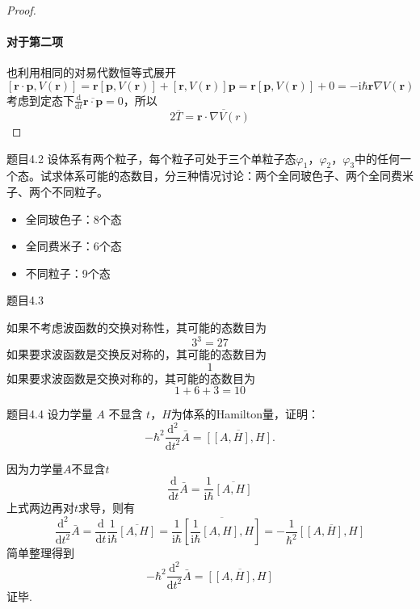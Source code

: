 \begin{proof}
    \paragraph{对于第二项} 也利用相同的对易代数恒等式展开
    $$
        \left[\boldsymbol{r}\cdot\boldsymbol{p}, V(\boldsymbol{r})\right]
        = \boldsymbol{r}\left[\boldsymbol{p}, V(\boldsymbol{r})\right] + \left[\boldsymbol{r}, V(\boldsymbol{r})\right]\boldsymbol{p}
        =\boldsymbol{r}[\boldsymbol{p}, V(\boldsymbol{r})]+0
        = -\mathrm{i}\hbar\boldsymbol{r}\nabla{V(\boldsymbol{r})}
    $$
    考虑到定态下$\frac{\mathrm{d}}{\mathrm{d}t}\overline{\boldsymbol{r}\cdot\boldsymbol{p}}=0$，所以
    $$
        2\overline{T} = \overline{\boldsymbol{r}\cdot\nabla{V(r)}}
    $$
\end{proof}


\begin{question}{题目4.2}
    设体系有两个粒子，每个粒子可处于三个单粒子态$\varphi_1$，$\varphi_2$，$\varphi_3$中的任何一个态。试求体系可能的态数目，分三种情况讨论：两个全同玻色子、两个全同费米子、两个不同粒子。
\end{question}
\begin{solution}
    \begin{itemize}
        \item 全同玻色子：8个态
        \item 全同费米子：6个态
        \item 不同粒子：9个态
    \end{itemize}
\end{solution}


\begin{question}{题目4.3}

\end{question}
\begin{solution}
    如果不考虑波函数的交换对称性，其可能的态数目为
    $$
        3^3=27
    $$
    如果要求波函数是交换反对称的，其可能的态数目为
    $$
        1
    $$
    如果要求波函数是交换对称的，其可能的态数目为
    $$
        1+6+3=10
    $$
\end{solution}






\begin{question}{题目4.4}
    设力学量 $A$ 不显含 $t$，$H$为体系的Hamilton量，证明：
    $$
        -\hbar^2\frac{\mathrm{d}^2}{\mathrm{d}t^2}\bar{A} = \overline{[[A, H], H]}.
    $$
\end{question}
\begin{solution}
    因为力学量$A$不显含$t$
    $$
        \frac{\mathrm{d}}{\mathrm{d}t}\bar{A}=\frac{1}{\mathrm{i}\hbar}\overline{[A, H]}
    $$
    上式两边再对$t$求导，则有
    $$
        \frac{\mathrm{d}^2}{\mathrm{d}t^2}\bar{A}
        =\frac{\mathrm{d}}{\mathrm{d}t}\frac{1}{\mathrm{i}\hbar}\overline{[A, H]}
        =\frac{1}{\mathrm{i}\hbar}\overline{\left[\frac{1}{\mathrm{i}\hbar}[A, H], H\right]}
        =-\frac{1}{\hbar^2}\overline{\left[[A, H], H\right]}
    $$
    简单整理得到
    $$
        -\hbar^2\frac{\mathrm{d}^2}{\mathrm{d}t^2}\bar{A} = \overline{[[A, H], H]}
    $$
    证毕.
\end{solution}




